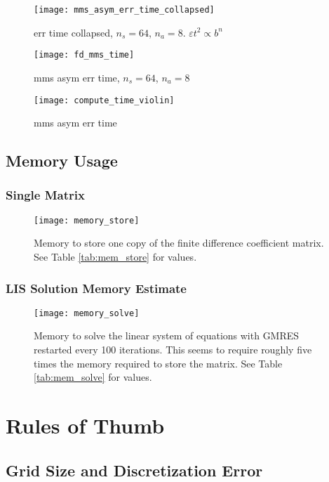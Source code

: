 \begin{figure}[H]
  \centering
  \texttt{[image: mms\_asym\_err\_time\_collapsed]}
  \caption{err time collapsed, $n_s=64$, $n_a=8$. $\varepsilon t^2 \propto b^n$}
  \label{fig:mms_asym_err_time_collapsed}
\end{figure}

\begin{figure}[H]
  \centering
  \texttt{[image: fd\_mms\_time]}
  \caption{mms asym err time, $n_s=64$, $n_a=8$}
  \label{fig:fd_mms_time}
\end{figure}

\begin{figure}[H]
  \centering
  \texttt{[image: compute\_time\_violin]}
  \caption{mms asym err time}
  \label{fig:compute_time_violin}
\end{figure}

\subsection{Memory Usage}
\subsubsection{Single Matrix}
\begin{figure}[H]
  \centering
  \texttt{[image: memory\_store]}
  \caption{Memory to store one copy of the finite difference coefficient matrix. See Table \ref{tab:mem_store} for values.}
  \label{fig:memory_store}
\end{figure}

\subsubsection{LIS Solution Memory Estimate}
\begin{figure}[H]
  \centering
  \texttt{[image: memory\_solve]}
  \caption{Memory to solve the linear system of equations with GMRES restarted every 100 iterations. This seems to require roughly five times the memory required to store the matrix. See Table \ref{tab:mem_solve} for values.}
  \label{fig:memory_solve}
\end{figure}


\section{Rules of Thumb}
\subsection{Grid Size and Discretization Error}
